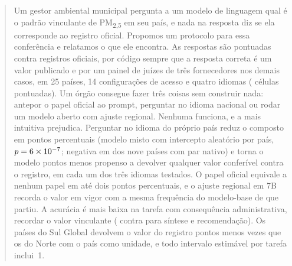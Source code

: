 \begin{abstract}

Um gestor ambiental municipal pergunta a um modelo de linguagem qual é o padrão
vinculante de PM\textsubscript{2,5} em seu país, e nada na resposta diz se ela
corresponde ao registro oficial. Propomos um protocolo para essa conferência e
relatamos o que ele encontra. As respostas são pontuadas contra registros
oficiais, por código sempre que a resposta correta é um valor publicado e por um
painel de juízes de três fornecedores nos demais casos, em 25 países, 14
configurações de acesso e quatro idiomas (\ncellspt{} células pontuadas). Um órgão consegue fazer três coisas sem
construir nada: antepor o papel oficial ao prompt, perguntar no idioma nacional
ou rodar um modelo aberto com ajuste regional. Nenhuma funciona, e a mais
intuitiva prejudica. Perguntar no idioma do próprio país reduz o composto em
\nhtwomixedcountryabs{} pontos percentuais (modelo misto com intercepto
aleatório por país, $p=\nhtwomixedcountryp$; negativa em \nhtwocneg{} dos nove
países com par nativo) e torna o modelo \nverifdiffabs{} pontos menos propenso a
devolver qualquer valor conferível contra o registro, em cada um dos três
idiomas testados. O papel oficial equivale a nenhum papel em até dois pontos
percentuais, e o ajuste regional em 7B recorda o valor em vigor com a mesma
frequência do modelo-base de que partiu. A acurácia é mais baixa na tarefa com
consequência administrativa, recordar o valor vinculante (\ntasktoneshort{}
contra \nfloorrestshort{} para síntese e recomendação). Os países do Sul Global
devolvem o valor do registro \ncodegapabs{} pontos menos vezes que os do Norte
com o país como unidade, e todo intervalo estimável por tarefa inclui~1.

\end{abstract}
